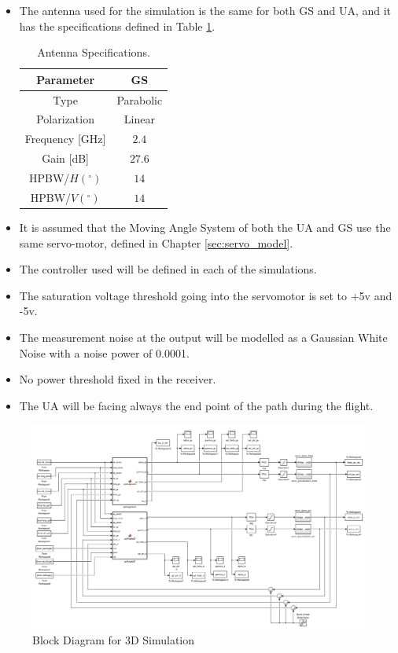 \begin{itemize}
\item{The antenna used for the simulation is the same for both GS and UA, and it has the specifications defined in Table \ref{table:2}.}
\begin{table}[h]
	\centering
	\begin{tabular}{|c||c|}
		\hline
		Parameter & GS\\ \hline\hline
		Type & Parabolic\\ \hline
		Polarization & Linear\\ \hline
		Frequency [GHz] & $2.4$\\ \hline
		Gain [dB] & $27.6$\\ \hline
		HPBW/$H(^{\circ})$ & $14$\\ \hline
		HPBW/$V(^{\circ})$ & $14$\\ \hline
	\end{tabular}
	\caption{Antenna Specifications.}
	\label{table:2}
\end{table}
\item{It is assumed that the Moving Angle System of both the UA and GS use the same servo-motor, defined in Chapter \ref{sec:servo_model}.}
\item{The controller used will be defined in each of the simulations.}
\item{The saturation voltage threshold going into the servomotor is set to +5v and -5v.}
\item{The measurement noise at the output will be modelled as a Gaussian White Noise with a noise power of 0.0001.}
\item{No power threshold fixed in the receiver.}
\item{The UA will be facing always the end point of the path during the flight.}
\end{itemize}

\clearpage

\begin{figure}
	\centering
	\includegraphics[width=1.1\textwidth,height=1.1\textheight,keepaspectratio]{figures/diagram_3D.png}
	\caption{Block Diagram for 3D Simulation}
   	\label{fig:diagram3D}
\end{figure}

\clearpage






